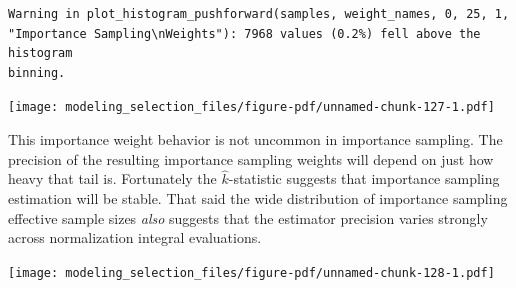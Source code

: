 \documentclass[
  letterpaper,
  DIV=11,
  numbers=noendperiod]{scrartcl}
\newenvironment{Shaded}{\begin{snugshade}}{\end{snugshade}}
\newcommand{\AttributeTok}[1]{\textcolor[rgb]{0.40,0.45,0.13}{#1}}
\newcommand{\DecValTok}[1]{\textcolor[rgb]{0.68,0.00,0.00}{#1}}
\newcommand{\FloatTok}[1]{\textcolor[rgb]{0.68,0.00,0.00}{#1}}
\newcommand{\FunctionTok}[1]{\textcolor[rgb]{0.28,0.35,0.67}{#1}}
\newcommand{\NormalTok}[1]{\textcolor[rgb]{0.00,0.23,0.31}{#1}}
\newcommand{\SpecialCharTok}[1]{\textcolor[rgb]{0.37,0.37,0.37}{#1}}
\newcommand{\StringTok}[1]{\textcolor[rgb]{0.13,0.47,0.30}{#1}}
\begin{document}
\begin{verbatim}
Warning in plot_histogram_pushforward(samples, weight_names, 0, 25, 1,
"Importance Sampling\nWeights"): 7968 values (0.2%) fell above the histogram
binning.
\end{verbatim}

\texttt{[image: modeling\_selection\_files/figure-pdf/unnamed-chunk-127-1.pdf]}

This importance weight behavior is not uncommon in importance sampling.
The precision of the resulting importance sampling weights will depend
on just how heavy that tail is. Fortunately the \(\hat{k}\)-statistic
suggests that importance sampling estimation will be stable. That said
the wide distribution of importance sampling effective sample sizes
\emph{also} suggests that the estimator precision varies strongly across
normalization integral evaluations.

\begin{Shaded}
\end{Shaded}

\texttt{[image: modeling\_selection\_files/figure-pdf/unnamed-chunk-128-1.pdf]}
\end{document}

